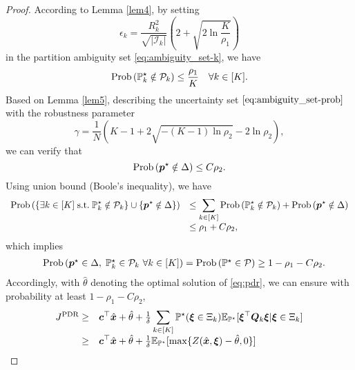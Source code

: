 \documentclass{article}
\newcommand{\PP}{\mathbb{P}}
\newcommand{\EE}{\mathbb{E}}
\begin{document}
\begin{proof}
According to Lemma \ref{lem4}, by setting 
$$\epsilon_k = \frac{R_k^2}{\sqrt{|\mathcal{I}_k|}} \left(2+\sqrt{2\ln\frac{K}{\rho_1}}\right)$$
in the partition ambiguity set \eqref{eq:ambiguity_set-k}, we have
$$\textup{Prob} \left( \PP_k^\star \notin \mathcal{P}_k \right) \leq \frac{\rho_1}{K} \quad \forall k \in [K].$$
Based on Lemma \ref{lem5}, describing the uncertainty set $\eqref{eq:ambiguity_set-prob}$ with the robustness parameter 
$$\gamma = \frac{1}{N}\left (K - 1 + 2\sqrt{-(K-1)\ln{\rho_2}} - 2\ln{\rho_2}\right),$$
we can verify that
$$\textup{Prob} \left( \bm p^\star \notin \Delta \right) \leq C\rho_2.$$
Using union bound (Boole's inequality), we have %
\begin{equation*}
\begin{array}{cl}
  \displaystyle  \textup{Prob} \left(\{\exists k \in [K] \;\textup{s.t.}\; \PP_k^\star \notin \mathcal{P}_k\}\cup \{\bm p^\star \notin \Delta \}\right) 
    &\displaystyle\leq \sum_{k \in [K]} \textup{Prob} \left( \PP_k^\star \notin \mathcal{P}_k \right) + \textup{Prob} \left( \bm p^\star \notin \Delta \right) \\
    & \displaystyle\leq \rho_1 + C\rho_2,
\end{array}
\end{equation*}
which implies
\begin{equation*}
\begin{array}{cc}
    & \textup{Prob} \left (\bm p^\star \in \Delta, \; \PP_k^\star \in \mathcal{P}_k \ \forall k \in [K] \right) = \textup{Prob} \left(\PP^\star \in \mathcal{P} \right) \geq 1 - \rho_1 - C\rho_2.
\end{array}
\end{equation*}
Accordingly, with $\hat{\theta}$ denoting the optimal solution of \eqref{eq:pdr}, we can ensure with probability at least $1 - \rho_1 - C\rho_2$,
\begin{equation*}
\begin{array}{rlll}
  J^{\textup{PDR}}\geq & \displaystyle \bm c^\top \hat{\bm x} + \hat \theta + \tfrac{1}{\delta} \sum_{k \in [K]}  \PP^\star (\bm \xi \in \Xi_k)\EE_{\PP^\star} [\bm \xi^\top \bm Q_k \bm\xi | \bm\xi\in\Xi_k]  \\
  \geq & \displaystyle \bm c^\top \hat{\bm x} + \hat \theta + \tfrac{1}{\delta} \EE_{\PP^\star} [\max \{ Z(\hat{\bm x},\bm \xi)-\hat{\theta},0 \}]  \\

\end{array}
\end{equation*}
\end{proof}
\end{document}
